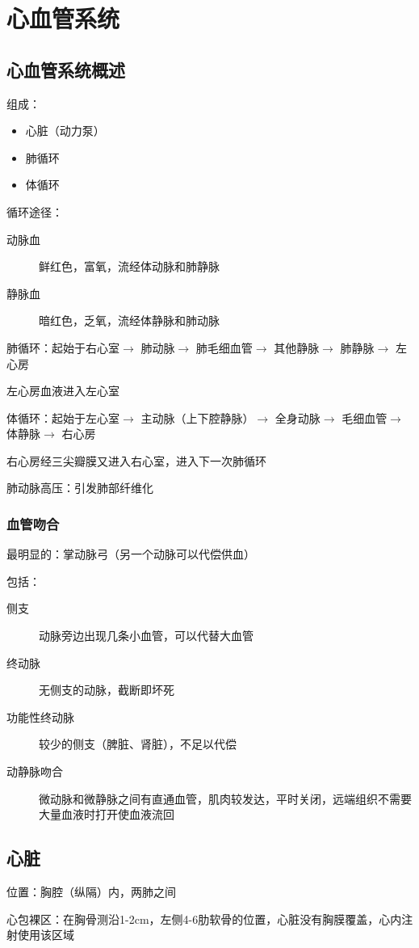 \section{心血管系统}%
\label{sec:心血管系统}
\subsection{心血管系统概述}%
\label{sub:心血管系统概述}
组成：
\begin{itemize}
    \item 心脏（动力泵）
    \item 肺循环
    \item 体循环
\end{itemize}
循环途径：
\begin{description}
    \item[动脉血] 鲜红色，富氧，流经体动脉和肺静脉
    \item [静脉血] 暗红色，乏氧，流经体静脉和肺动脉
\end{description}
肺循环：起始于右心室$\to $ 肺动脉$\to $ 肺毛细血管$\to $ 其他静脉$\to $ 肺静脉$\to $ 左心房

左心房血液进入左心室

体循环：起始于左心室$\to $ 主动脉（上下腔静脉）$\to $ 全身动脉$\to $ 毛细血管$\to $ 体静脉$\to $ 右心房

右心房经三尖瓣膜又进入右心室，进入下一次肺循环
\begin{notation}
肺动脉高压：引发肺部纤维化
\end{notation}
\subsubsection*{血管吻合}%
\label{subsub:血管吻合}
最明显的：掌动脉弓（另一个动脉可以代偿供血）

包括：\begin{description}
    \item [侧支] 动脉旁边出现几条小血管，可以代替大血管
    \item [终动脉] 无侧支的动脉，截断即坏死
    \item [功能性终动脉] 较少的侧支（脾脏、肾脏），不足以代偿
    \item [动静脉吻合] 微动脉和微静脉之间有直通血管，肌肉较发达，平时关闭，远端组织不需要大量血液时打开使血液流回
\end{description}
\subsection{心脏}%
\label{sub:心脏}
位置：胸腔（纵隔）内，两肺之间
\begin{notation}
心包裸区：在胸骨测沿1-2cm，左侧4-6肋软骨的位置，心脏没有胸膜覆盖，心内注射使用该区域
\end{notation}
